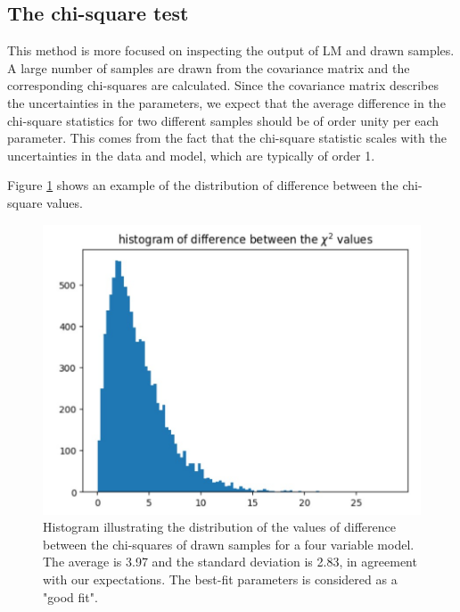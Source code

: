 \documentclass[12pt, TexShade, letterpaper]{report}
\begin{document}
\subsection{The chi-square test}
\label{chap:method,sub:test,subsub:chi}
This method is more focused on inspecting the output of LM and drawn samples. A large number of samples are drawn from the covariance matrix and the corresponding chi-squares are calculated. Since the covariance matrix describes the uncertainties in the parameters, we expect that the average difference in the chi-square statistics for two different samples should be of order unity per each parameter. This comes from the fact that the chi-square statistic scales with the uncertainties in the data and model, which are typically of order 1.\par
Figure \ref{fig:csq_test} shows an example of the distribution of difference between the chi-square values.\par
\begin{figure}[h!]
\centering
\includegraphics[scale =0.9]{chi-sqaure test.jpg}
\caption[Histogram of difference in the chi-square values of drawn samples]{Histogram illustrating the distribution of the values of difference between the chi-squares of drawn samples for a four variable model. The average is 3.97 and the standard deviation is 2.83, in agreement with our expectations. The best-fit parameters is considered as a "good fit".}
\label{fig:csq_test}
\end{figure}
\end{document}

